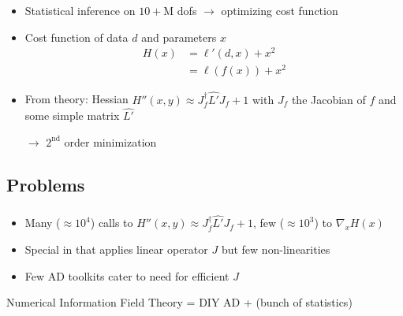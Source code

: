 \documentclass[aspectratio=169,xcolor=dvipsnames]{beamer}
\renewcommand{\footnotesize}{\tiny}
\begin{document}
\begin{frame}
	\frametitle{\insertsection}
	\framesubtitle{\insertsubsection}

	\begin{itemize}
		\item Statistical inference on $10+$M dofs $\rightarrow$ optimizing cost function
		\item Cost function of data $d$ and parameters $x$
		\begin{align*}
			H(x) &= \ell'(d, x) + x^2
			\\ &= \ell(f(x)) + x^2
		\end{align*}
		\item From theory: Hessian $H''(x, y) \approx J_f^\dagger \hat{L'} J_f + 1$ {\footnotesize\color{gray}with $J_f$ the Jacobian of $f$ and some simple matrix $\hat{L'}$}
		\item[$\rightarrow$] $2^\text{nd}$ order minimization
	\end{itemize}

\end{frame}

\subsection{Problems}  %
\begin{frame}
	\frametitle{\insertsection}
	\framesubtitle{\insertsubsection}

	\begin{itemize}
		\item Many ($\approx10^4$) calls to $H''(x, y) \approx J_f^\dagger \hat{L'} J_f + 1$, few ($\approx10^3$) to $\nabla_x H(x)$
		\item Special in that applies linear operator $J$ but few non-linearities
		\item Few AD toolkits cater to need for efficient $J$
	\end{itemize}

	\begin{center}
		Numerical Information Field Theory = DIY AD + (bunch of statistics)
	\end{center}

\end{frame}
\end{document}
